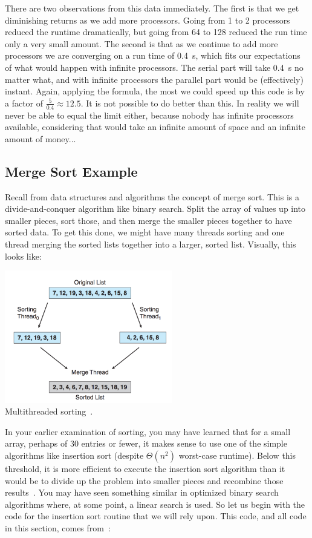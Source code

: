 There are two observations from this data immediately. The first is that we get diminishing returns as we add more processors. Going from 1 to 2 processors reduced the runtime dramatically, but going from 64 to 128 reduced the run time only a very small amount. The second is that as we continue to add more processors we are converging on a run time of 0.4~s, which fits our expectations of what would happen with infinite processors. The serial part will take 0.4~s no matter what, and with infinite processors the parallel part would be (effectively) instant. Again, applying the formula, the most we could speed up this code is by a factor of $\frac{5}{0.4}\approx 12.5$. It is not possible to do better than this. In reality we will never be able to equal the limit either, because nobody has infinite processors available, considering that would take an infinite amount of space and an infinite amount of money...

\subsection*{Merge Sort Example}
Recall from data structures and algorithms the concept of merge sort. This is a divide-and-conquer algorithm like binary search. Split the array of values up into smaller pieces, sort those, and then merge the smaller pieces together to have sorted data. To get this done, we might have many threads sorting and one thread merging the sorted lists together into a larger, sorted list. Visually, this looks like:

\begin{center}
	\includegraphics[width=0.55\textwidth]{images/multithread-sort.png}\\
	Multithreaded sorting~\cite{osc}.
\end{center}

In your earlier examination of sorting, you may have learned that for a small array, perhaps of 30 entries or fewer, it makes sense to use one of the simple algorithms like insertion sort (despite $\Theta(n^{2})$ worst-case runtime). Below this threshold, it is more efficient to execute the insertion sort algorithm than it would be to divide up the problem into smaller pieces and recombine those results~\cite{mte241}. You may have seen something similar in optimized binary search algorithms where, at some point, a linear search is used. So let us begin with the code for the insertion sort routine that we will rely upon. This code, and all code in this section, comes from~\cite{mte241}:

